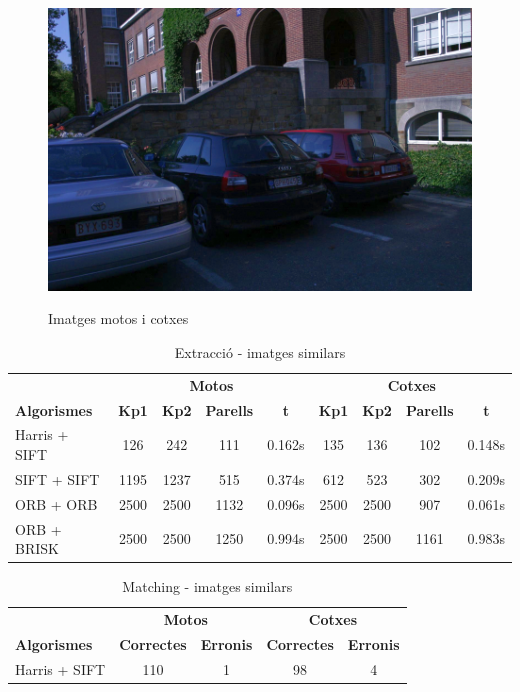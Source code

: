 \begin{figure}[!htb]
				\label{fig:awesome_image3}
			\endminipage\hfill
				\includegraphics[width=\linewidth]{images/experiments/cars6}
				\label{fig:awesome_image3}
			\endminipage
			\caption{Imatges motos i cotxes}
		\end{figure}

		\begin{table}[H]
			\begin{center}
				\begin{tabular}{l | c c c c | c c c c}
					& \multicolumn{4}{c|}{\textbf{Motos}} & \multicolumn{4}{c}{\textbf{Cotxes}} \\
					\textbf{Algorismes} & \textbf{Kp1} & \textbf{Kp2} & \textbf{Parells} & \textbf{t} & \textbf{Kp1} & \textbf{Kp2} & \textbf{Parells} & \textbf{t} \\ \hline
					Harris + SIFT & 126 & 242 & 111 & 0.162s & 135 & 136 & 102 & 0.148s \\
					SIFT + SIFT & 1195 & 1237 & 515 & 0.374s & 612 & 523 & 302 & 0.209s \\
					ORB + ORB & 2500 & 2500 & 1132 & 0.096s & 2500 & 2500 & 907 & 0.061s \\
					ORB + BRISK & 2500 & 2500 & 1250 & 0.994s & 2500 & 2500 & 1161 & 0.983s \\
				\end{tabular}
			\end{center}
			\caption{Extracció - imatges similars}
		\end{table}

		\begin{table}[H]
			\begin{center}
				\begin{tabular}{l | c c | c c}
					& \multicolumn{2}{c|}{\textbf{Motos}} & \multicolumn{2}{c}{\textbf{Cotxes}} \\
					\textbf{Algorismes} & \textbf{Correctes} & \textbf{Erronis} & \textbf{Correctes} & \textbf{Erronis} \\ \hline
					Harris + SIFT & 110 & 1 & 98 & 4 \\
				\end{tabular}
			\end{center}
			\caption{Matching - imatges similars}
		\end{table}

